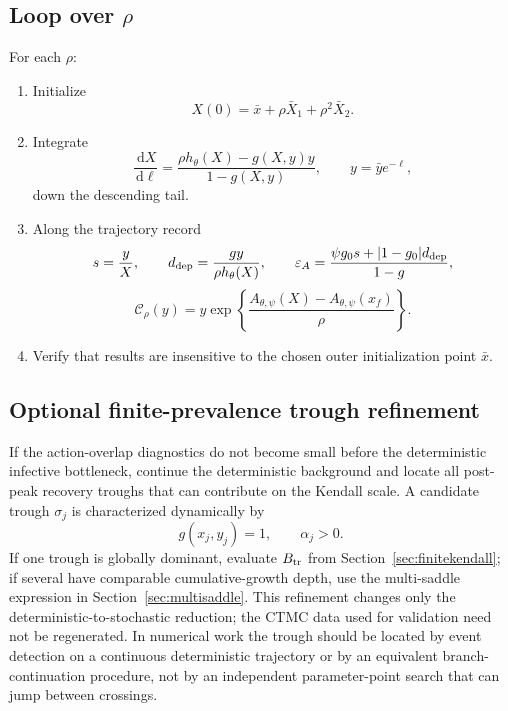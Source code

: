 \documentclass[11pt]{article}
\newcommand{\hth}{h_\theta}
\newcommand{\Apsi}{A_{\theta,\psi}}
\newcommand{\xf}{x_f}
\newcommand{\dd}{\,\mathrm{d}}
\newcommand{\CalC}{\mathcal C_\rho}
\newcommand{\gh}{g_0}
\newcommand{\epsA}{\varepsilon_A}
\begin{document}
\subsection{Loop over \texorpdfstring{$\rho$}{rho}}
For each $\rho$:
\begin{enumerate}
\item Initialize
\[
X(0)=\bar x+\rho\bar X_1+\rho^2\bar X_2.
\]
\item Integrate
\[
\frac{\dd X}{\dd\ell}
=\frac{\rho\hth(X)-g(X,y)y}{1-g(X,y)},
\qquad
y=\bar y e^{-\ell},
\]
down the descending tail.
\item Along the trajectory record
\[
s=\frac yX,
\qquad
d_{\rm dep}=\frac{gy}{\rho\hth(X)},
\qquad
\epsA=\frac{\psi\gh s+|1-\gh|d_{\rm dep}}{1-g},
\]
\[
\CalC(y)=y\exp\left\{\frac{\Apsi(X)-\Apsi(\xf)}\rho\right\}.
\]
\item Verify that results are insensitive to the chosen outer initialization point $\bar x$.
\end{enumerate}

\subsection{Optional finite-prevalence trough refinement}
If the action-overlap diagnostics do not become small before the deterministic infective bottleneck, continue the deterministic background and locate all post-peak recovery troughs that can contribute on the Kendall scale.  A candidate trough $\sigma_j$ is characterized dynamically by
\[
g(x_j,y_j)=1,
\qquad
\alpha_j>0.
\]
If one trough is globally dominant, evaluate $B_{\rm tr}$ from Section~\ref{sec:finitekendall}; if several have comparable cumulative-growth depth, use the multi-saddle expression in Section~\ref{sec:multisaddle}.  This refinement changes only the deterministic-to-stochastic reduction; the CTMC data used for validation need not be regenerated.  In numerical work the trough should be located by event detection on a continuous deterministic trajectory or by an equivalent branch-continuation procedure, not by an independent parameter-point search that can jump between crossings.
\end{document}
